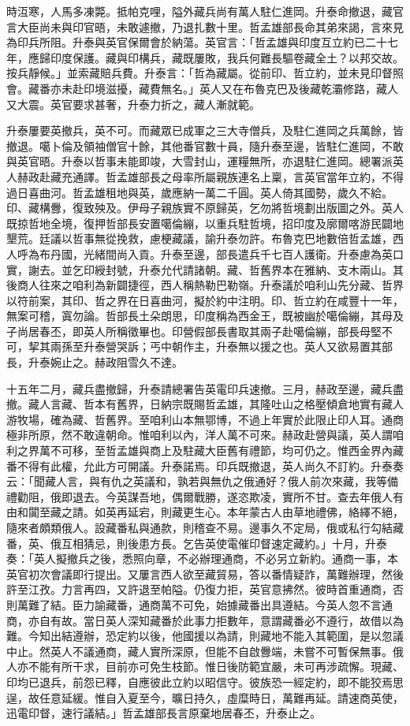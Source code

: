 \begin{pinyinscope}
時沍寒，人馬多凍斃。抵帕克哩，隘外藏兵尚有萬人駐仁進岡。升泰命撤退，藏官言大臣尚未與印官晤，未敢遽撤，乃退扎數十里。哲孟雄部長命其弟來謁，言來見為印兵所阻。升泰與英官保爾會於納蕩。英官言：「哲孟雄與印度互立約已二十七年，應歸印度保護。藏與印構兵，藏既屢敗，我兵何難長驅卷藏全土？以邦交故。按兵靜候。」並索藏賠兵費。升泰言：「哲為藏屬。從前印、哲立約，並未見印督照會。藏番亦未赴印境滋擾，藏費無名。」英人又在布魯克巴及後藏乾灞修路，藏人又大震。英官要求甚奢，升泰力折之，藏人漸就範。

升泰屢要英撤兵，英不可。而藏眾已成軍之三大寺僧兵，及駐仁進岡之兵萬餘，皆撤退。噶卜倫及領袖僧官十餘，其他番官數十員，隨升泰至邊，皆駐仁進岡，不敢與英官晤。升泰以哲事未能即竣，大雪封山，運糧無所，亦退駐仁進岡。總署派英人赫政赴藏充通譯。哲孟雄部長之母率所屬親族連名上稟，言英官當年立約，不得過日喜曲河。哲孟雄租地與英，歲應納一萬二千圓。英人倚其國勢，歲久不給。印、藏構釁，復致殃及。伊母子親族實不原歸英，乞勿將哲境劃出版圖之外。英人既掠哲地全境，復押哲部長安置噶倫繃，以重兵駐哲境，招印度及廓爾喀游民闢地墾荒。廷議以哲事無從挽救，慮梗藏議，諭升泰勿許。布魯克巴地數倍哲孟雄，西人呼為布丹國，光緒間尚入貢。升泰至邊，部長遣兵千七百人護衛。升泰慮為英口實，謝去。並乞印綬封號，升泰允代請諸朝。藏、哲舊界本在雅納、支木兩山。其後商人往來之咱利為新闢捷徑，西人稱熱勒巴勒嶺。升泰議於咱利山先分藏、哲界以符前案，其印、哲之界在日喜曲河，擬於約中注明。印、哲立約在咸豐十一年，無案可稽，寘勿論。哲部長土朵朗思，印度稱為西金王，既被幽於噶倫繃，其母及子尚居春丕，即英人所稱徵畢也。印營假部長書取其兩子赴噶倫繃，部長母堅不可，挈其兩孫至升泰營哭訴；丐中朝作主，升泰無以援之也。英人又欲易置其部長，升泰婉止之。赫政阻雪久不達。

十五年二月，藏兵盡撤歸，升泰請總署告英電印兵速撤。三月，赫政至邊，藏兵盡撤。藏人言藏、哲本有舊界，日納宗既賜哲孟雄，其隆吐山之格壓傾倉地實有藏人游牧場，確為藏、哲舊界。至咱利山本無鄂博，不過上年實於此限止印人耳。通商極非所原，然不敢違朝命。惟咱利以內，洋人萬不可來。赫政赴營與議，英人謂咱利之界萬不可移，至哲孟雄與商上及駐藏大臣舊有禮節，均可仍之。惟西金界內藏番不得有此權，允此方可開議。升泰諾焉。印兵既撤退，英人尚久不訂約。升泰奏云：「聞藏人言，與有仇之英議和，孰若與無仇之俄通好？俄人前次來藏，我等備禮勸阻，俄即退去。今英謀吾地，偶爾戰勝，遂恣欺凌，實所不甘。查去年俄人有由和闐至藏之請。如英再延宕，則藏更生心。本年蒙古人由草地禮佛，絡繹不絕，隨來者頗類俄人。設藏番私與通款，則稽查不易。邊事久不定局，俄或私行勾結藏番，英、俄互相猜忌，則後患方長。乞告英使電催印督速定藏約。」十月，升泰奏：「英人擬撤兵之後，悉照向章，不必辦理通商，不必另立新約。通商一事，本英官初次會議即行提出。又屢言西人欲至藏貿易，答以番情疑詐，萬難辦理，然後許至江孜。力言再四，又許退至帕隘。仍復力拒，英官意拂然。彼時首重通商，否則萬難了結。臣力諭藏番，通商萬不可免，始據藏番出具遵結。今英人忽不言通商，亦自有故。當日英人深知藏番於此事力拒數年，意謂藏番必不遵行，故借以為難。今知出結遵辦，恐定約以後，他國援以為請，則藏地不能入其範圍，是以忽議中止。然英人不議通商，藏人實所深原，但能不自啟釁端，未嘗不可暫保無事。俄人亦不能有所干求，目前亦可免生枝節。惟日後防範宜嚴，未可再涉疏懈。現藏、印均已退兵，前怨已釋，自應彼此立約以昭信守。彼族恐一經定約，即不能狡焉思逞，故任意延緩。惟自入夏至今，曠日持久，虛糜時日，萬難再延。請速商英使，迅電印督，速行議結。」哲孟雄部長言原棄地居春丕，升泰止之。


\end{pinyinscope}
